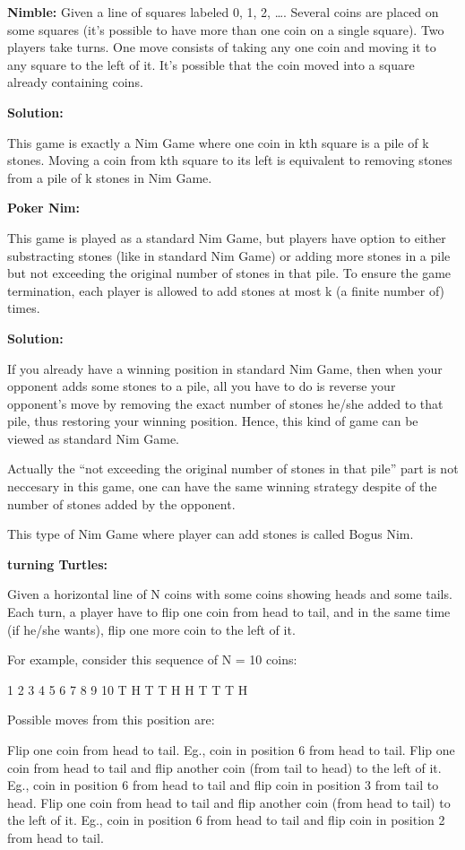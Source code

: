 \textbf{Nimble:}
Given a line of squares labeled 0, 1, 2, …. Several coins are placed on some squares (it’s possible to have more than one coin on a single square). Two players take turns. One move consists of taking any one coin and moving it to any square to the left of it. It’s possible that the coin moved into a square already containing coins.

\textbf{Solution:}

	This game is exactly a Nim Game where one coin in kth square is a pile of k stones. Moving a coin from kth square to its left is 		equivalent to removing stones from a pile of k stones in Nim Game.

\textbf{Poker Nim:}

This game is played as a standard Nim Game, but players have option to either substracting stones (like in standard Nim Game) or adding more stones in a pile but not exceeding the original number of stones in that pile. To ensure the game termination, each player is allowed to add stones at most k (a finite number of) times.

\textbf{Solution:}

	If you already have a winning position in standard Nim Game, then when your opponent adds some stones to a pile, all you have to do is 		reverse your opponent’s move by removing the exact number of stones he/she added to that pile, thus restoring your winning position. 		
	Hence, this kind of game can be viewed as standard Nim Game.

	Actually the “not exceeding the original number of stones in that pile” part is not neccesary in this game, one can have the same winning 		strategy despite of the number of stones added by the opponent.

	This type of Nim Game where player can add stones is called Bogus Nim.


\textbf{turning Turtles:}

Given a horizontal line of N coins with some coins showing heads and some tails. Each turn, a player have to flip one coin from head to tail, and in the same time (if he/she wants), flip one more coin to the left of it.

For example, consider this sequence of N = 10 coins:

1 2 3 4 5 6 7 8 9 10
T H T T H H T T T H

Possible moves from this position are:

Flip one coin from head to tail. Eg., coin in position 6 from head to tail.
Flip one coin from head to tail and flip another coin (from tail to head) to the left of it. Eg., coin in position 6 from head to tail and flip coin in position 3 from tail to head.
Flip one coin from head to tail and flip another coin (from head to tail) to the left of it. Eg., coin in position 6 from head to tail and flip coin in position 2 from head to tail.

